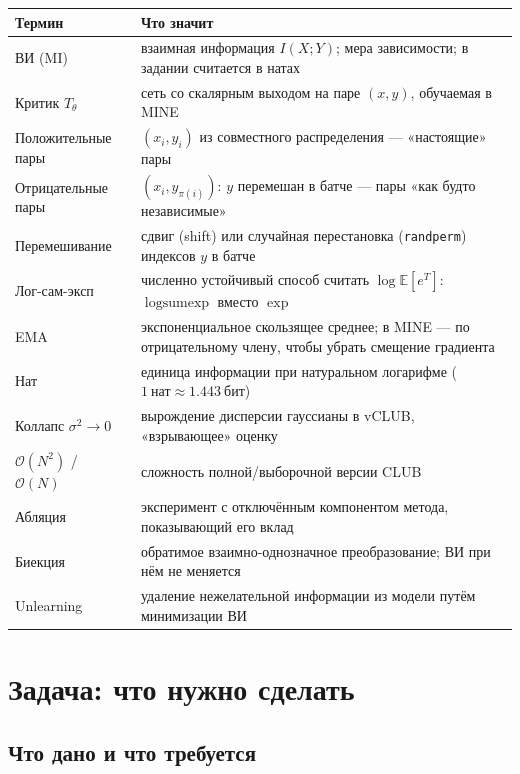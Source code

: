 \documentclass[11pt]{article}
\newcommand{\nat}{\text{нат}}
\newcommand{\bit}{\text{бит}}
\newcommand{\MI}{I(X;Y)}
\newcommand{\EE}{\mathbb{E}}
\begin{document}
\begin{center}
\small
\begin{tabular}{@{}p{5.2cm}p{9.3cm}@{}}
\toprule
Термин & Что значит \\
\midrule
ВИ (MI) & взаимная информация $\MI$; мера зависимости; в задании считается в натах \\
Критик $T_\theta$ & сеть со скалярным выходом на паре $(x,y)$, обучаемая в MINE \\
Положительные пары & $(x_i,y_i)$ из совместного распределения — «настоящие» пары \\
Отрицательные пары & $(x_i,y_{\pi(i)})$: $y$ перемешан в батче — пары «как будто независимые» \\
Перемешивание & сдвиг (shift) или случайная перестановка (\texttt{randperm}) индексов $y$ в батче \\
Лог-сам-эксп & численно устойчивый способ считать $\log\EE[e^T]$: $\operatorname{logsumexp}$ вместо $\exp$ \\
EMA & экспоненциальное скользящее среднее; в MINE — по отрицательному члену, чтобы убрать смещение градиента \\
Нат & единица информации при натуральном логарифме ($1\ \nat\approx1.443\ \bit$) \\
Коллапс $\sigma^2\to0$ & вырождение дисперсии гауссианы в vCLUB, «взрывающее» оценку \\
$\mathcal{O}(N^2)$ / $\mathcal{O}(N)$ & сложность полной/выборочной версии CLUB \\
Абляция & эксперимент с отключённым компонентом метода, показывающий его вклад \\
Биекция & обратимое взаимно-однозначное преобразование; ВИ при нём не меняется \\
Unlearning & удаление нежелательной информации из модели путём минимизации ВИ \\
\bottomrule
\end{tabular}
\end{center}

\section{Задача: что нужно сделать}

\subsection{Что дано и что требуется}
\end{document}
